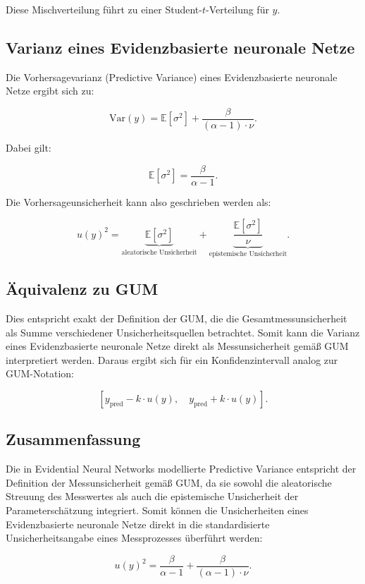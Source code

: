Diese Mischverteilung führt zu einer Student-\(t\)-Verteilung für \(y\).

\subsection*{Varianz eines \gls{Evidenzbasierte neuronale Netze}}

Die Vorhersagevarianz (Predictive Variance) eines \gls{Evidenzbasierte neuronale Netze} ergibt sich zu:

\begin{equation}
\mathrm{Var}(y) 
=
\mathbb{E}\left[\sigma^2\right] 
+ 
\frac{\beta}{(\alpha - 1)\cdot \nu}.
\end{equation}

Dabei gilt:

\begin{equation}
\mathbb{E}[\sigma^2] = \frac{\beta}{\alpha - 1}.
\end{equation}

Die Vorhersageunsicherheit kann also geschrieben werden als:

\begin{equation}
u(y)^2 
=
\underbrace{\mathbb{E}[\sigma^2]}_{\text{aleatorische Unsicherheit}}
+
\underbrace{\frac{\mathbb{E}[\sigma^2]}{\nu}}_{\text{epistemische Unsicherheit}}.
\end{equation}

\subsection*{Äquivalenz zu GUM}

Dies entspricht exakt der Definition der GUM, die die Gesamtmessunsicherheit als Summe verschiedener Unsicherheitsquellen betrachtet. Somit kann die Varianz eines \gls{Evidenzbasierte neuronale Netze} direkt als Messunsicherheit gemäß GUM interpretiert werden. Daraus ergibt sich für ein Konfidenzintervall analog zur GUM-Notation:

\begin{equation}
\left[
y_\text{pred} - k \cdot u(y),
\quad
y_\text{pred} + k \cdot u(y)
\right].
\end{equation}

\subsection*{Zusammenfassung}

Die in Evidential Neural Networks modellierte Predictive Variance entspricht der Definition der Messunsicherheit gemäß GUM, da sie sowohl die aleatorische Streuung des Messwertes als auch die epistemische Unsicherheit der Parameterschätzung integriert. Somit können die Unsicherheiten eines \gls{Evidenzbasierte neuronale Netze} direkt in die standardisierte Unsicherheitsangabe eines Messprozesses überführt werden:

\begin{equation}
u(y)^2 
=
\frac{\beta}{\alpha - 1}
+
\frac{\beta}{(\alpha - 1)\cdot \nu}.
\end{equation}
